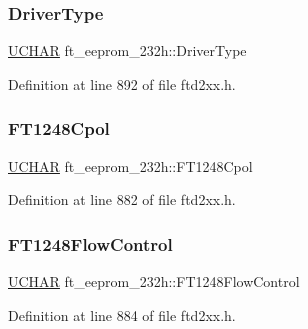 \subsubsection{\texorpdfstring{Driver\+Type}{DriverType}}
{\footnotesize\ttfamily \hyperlink{CatCaloProto40MHz_2inc_2WinTypes_8h_a4f4bb67531a9bf6f0b9c6ad76aeba587}{U\+C\+H\+AR} ft\+\_\+eeprom\+\_\+232h\+::\+Driver\+Type}



Definition at line 892 of file ftd2xx.\+h.

\mbox{\label{structft__eeprom__232h_a372c20cdeebb5c23498d740728ac4eae}} 
\subsubsection{\texorpdfstring{F\+T1248\+Cpol}{FT1248Cpol}}
{\footnotesize\ttfamily \hyperlink{CatCaloProto40MHz_2inc_2WinTypes_8h_a4f4bb67531a9bf6f0b9c6ad76aeba587}{U\+C\+H\+AR} ft\+\_\+eeprom\+\_\+232h\+::\+F\+T1248\+Cpol}



Definition at line 882 of file ftd2xx.\+h.

\mbox{\label{structft__eeprom__232h_adc5ff9bac7226be7b3181a64f24450dc}} 
\subsubsection{\texorpdfstring{F\+T1248\+Flow\+Control}{FT1248FlowControl}}
{\footnotesize\ttfamily \hyperlink{CatCaloProto40MHz_2inc_2WinTypes_8h_a4f4bb67531a9bf6f0b9c6ad76aeba587}{U\+C\+H\+AR} ft\+\_\+eeprom\+\_\+232h\+::\+F\+T1248\+Flow\+Control}



Definition at line 884 of file ftd2xx.\+h.

\mbox{\label{structft__eeprom__232h_a8c3cb15f176eaaad39fddedcae8ab10d}} 
